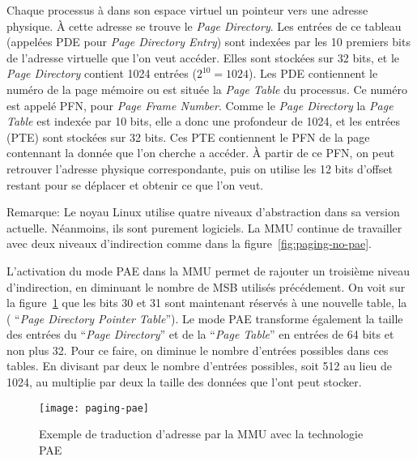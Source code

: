       Chaque processus à dans son espace virtuel un pointeur vers une adresse
      physique. À cette adresse se trouve le \textit{Page Directory}. Les
      entrées de ce tableau (appelées PDE pour \textit{Page Directory Entry})
      sont indexées par les 10 premiers bits de l'adresse virtuelle que l'on
      veut accéder. Elles sont stockées sur 32 bits, et le \textit{Page
        Directory} contient 1024 entrées ($2^{10} = 1024$). Les PDE contiennent
      le numéro de la page mémoire ou est située la \textit{Page Table} du
      processus. Ce numéro est appelé PFN, pour \textit{Page Frame
        Number}. Comme le \textit{Page Directory} la \textit{Page Table} est
      indexée par 10 bits, elle a donc une profondeur de 1024, et les entrées
      (PTE) sont stockées sur 32 bits. Ces PTE contiennent le PFN de la page
      contennant la donnée que l'on cherche a accéder. À partir de ce PFN, on
      peut retrouver l'adresse physique correspondante, puis on utilise les 12
      bits d'offset restant pour se déplacer et obtenir ce que l'on veut.

      \begin{paragraph}{Remarque:}
        Le noyau Linux utilise quatre niveaux d'abstraction dans sa version
        actuelle. Néanmoins, ils sont purement logiciels. La MMU continue de
        travailler avec deux niveaux d'indirection comme dans la
        figure~\ref{fig:paging-no-pae}.\newline
      \end{paragraph}
      
      L'activation du mode PAE dans la MMU permet de rajouter un troisième
      niveau d'indirection, en diminuant le nombre de MSB utilisés
      précédement. On voit sur la figure~\ref{fig:paging-pae} que les bits 30 et
      31 sont maintenant réservés à une nouvelle table, la ( ``\textit{Page
        Directory Pointer Table}''). Le mode PAE transforme également la taille
      des entrées du ``\textit{Page Directory}'' et de la ``\textit{Page
        Table}'' en entrées de 64 bits et non plus 32. Pour ce faire, on diminue
      le nombre d'entrées possibles dans ces tables. En divisant par deux le
      nombre d'entrées possibles, soit 512 au lieu de 1024, au multiplie par
      deux la taille des données que l'ont peut stocker.

      \begin{figure}[h]
        \centering \texttt{[image: paging-pae]}
        \caption{Exemple de traduction d'adresse par la MMU avec la technologie
          PAE}
        \label{fig:paging-pae}
      \end{figure}
      
